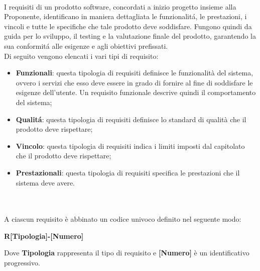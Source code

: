 \\
I requisiti di un prodotto software, concordati a inizio progetto insieme alla Proponente, identificano in maniera dettagliata le funzionalitá, le prestazioni, i vincoli e tutte le specifiche che tale prodotto deve soddisfare. Fungono quindi da guida per lo sviluppo, il testing e la valutazione finale del prodotto, garantendo la sua conformitá alle esigenze e agli obiettivi prefissati.\\
Di seguito vengono elencati i vari tipi di requisito:\\
\begin{itemize} 
    \item \textbf{Funzionali}: questa tipologia di requisiti definisce le funzionalità del sistema, ovvero i servizi che esso deve essere in grado di fornire al fine di soddisfare le esigenze dell'utente. Un requisito funzionale descrive quindi il comportamento del sistema;
    \item \textbf{Qualitá}: questa tipologia di requisiti definisce lo standard di qualità che il prodotto deve rispettare;
    \item \textbf{Vincolo}: questa tipologia di requisiti indica i limiti imposti dal capitolato che il prodotto deve rispettare;
    \item \textbf{Prestazionali}: questa tipologia di requisiti specifica le prestazioni che il sistema deve avere. 
\end{itemize}\\

\\
A ciascun requisito è abbinato un codice univoco definito nel seguente modo:
\begin{center}
    \textbf{R[Tipologia]-[Numero]}
\end{center}
Dove \textbf{Tipologia} rappresenta il tipo di requisito e \textbf{[Numero]} è un identificativo progressivo.
